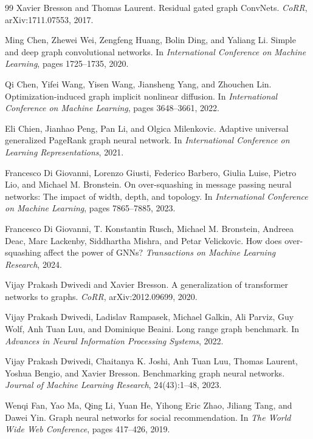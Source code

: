 \begin{thebibliography}{99}
Xavier Bresson and Thomas Laurent.
\newblock Residual gated graph ConvNets.
\newblock \emph{CoRR}, arXiv:1711.07553, 2017.

Ming Chen, Zhewei Wei, Zengfeng Huang, Bolin Ding, and Yaliang Li.
\newblock Simple and deep graph convolutional networks.
\newblock In \emph{International Conference on Machine Learning}, pages 1725--1735, 2020.

Qi Chen, Yifei Wang, Yisen Wang, Jiansheng Yang, and Zhouchen Lin.
\newblock Optimization-induced graph implicit nonlinear diffusion.
\newblock In \emph{International Conference on Machine Learning}, pages 3648--3661, 2022.

Eli Chien, Jianhao Peng, Pan Li, and Olgica Milenkovic.
\newblock Adaptive universal generalized PageRank graph neural network.
\newblock In \emph{International Conference on Learning Representations}, 2021.

Francesco Di Giovanni, Lorenzo Giusti, Federico Barbero, Giulia Luise, Pietro Lio, and Michael M. Bronstein.
\newblock On over-squashing in message passing neural networks: The impact of width, depth, and topology.
\newblock In \emph{International Conference on Machine Learning}, pages 7865--7885, 2023.

Francesco Di Giovanni, T. Konstantin Rusch, Michael M. Bronstein, Andreea Deac, Marc Lackenby, Siddhartha Mishra, and Petar Velickovic.
\newblock How does over-squashing affect the power of GNNs?
\newblock \emph{Transactions on Machine Learning Research}, 2024.

Vijay Prakash Dwivedi and Xavier Bresson.
\newblock A generalization of transformer networks to graphs.
\newblock \emph{CoRR}, arXiv:2012.09699, 2020.

Vijay Prakash Dwivedi, Ladislav Rampasek, Michael Galkin, Ali Parviz, Guy Wolf, Anh Tuan Luu, and Dominique Beaini.
\newblock Long range graph benchmark.
\newblock In \emph{Advances in Neural Information Processing Systems}, 2022.

Vijay Prakash Dwivedi, Chaitanya K. Joshi, Anh Tuan Luu, Thomas Laurent, Yoshua Bengio, and Xavier Bresson.
\newblock Benchmarking graph neural networks.
\newblock \emph{Journal of Machine Learning Research}, 24(43):1--48, 2023.

Wenqi Fan, Yao Ma, Qing Li, Yuan He, Yihong Eric Zhao, Jiliang Tang, and Dawei Yin.
\newblock Graph neural networks for social recommendation.
\newblock In \emph{The World Wide Web Conference}, pages 417--426, 2019.


\end{thebibliography}
